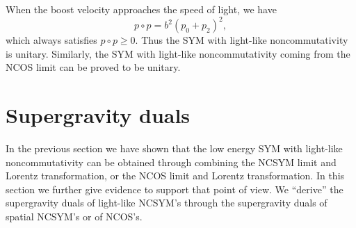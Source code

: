 \documentclass[a4paper,12pt]{article}
\newcommand{\sect}[1]{\setcounter{equation}{0}\section{#1}}
\begin{document}
When the boost velocity approaches the speed of light, we have
\begin{equation}
p\circ p = b^2(p_0 +p_2)^2,
\end{equation}
which always satisfies $p\circ p \ge 0$. Thus the SYM with light-like
noncommutativity is unitary. Similarly, the SYM with light-like
noncommutativity coming from the NCOS limit can be proved to be unitary.




\sect{Supergravity duals }

In the previous section we have shown that the low energy SYM with light-like
noncommutativity can be obtained through combining the NCSYM limit and Lorentz
transformation, or the NCOS limit and Lorentz transformation. In this section
we further give evidence to support that point of view. We ``derive'' the
supergravity duals of light-like NCSYM's through the
supergravity duals of spatial NCSYM's or of NCOS's.
\end{document}
